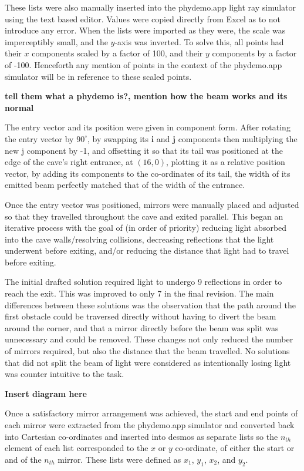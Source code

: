 \documentclass[11pt, letterpaper]{article}
\begin{document}
 
These lists were also manually inserted into the phydemo.app light ray simulator using the text based editor. Values were copied directly from Excel as to not introduce any error.  When the lists were imported as they were, the scale was imperceptibly small, and the $y$-axis was inverted. To solve this, all points had their $x$ components scaled by a factor of 100, and their $y$ components by a factor of -100. Henceforth any mention of points in the context of the phydemo.app simulator will be in reference to these scaled points.

\textbf{tell them what a phydemo is?, mention how the beam works and its normal}


The entry vector and its position were given in component form. After rotating the entry vector by $90^{\circ}$, by swapping its $\textbf{i}$ and $\textbf{j}$ components then multiplying the new j component by -1, and offsetting it so that its tail was positioned at the edge of the cave's right entrance, at $(16, 0)$, plotting it as a relative position vector, by adding its components to the co-ordinates of its tail, the width of its emitted beam perfectly matched that of the width of the entrance. 
		

Once the entry vector was positioned, mirrors were manually placed and adjusted so that they travelled throughout the cave and exited parallel. This began an iterative process with the goal of (in order of priority) reducing light absorbed into the cave walls/resolving collisions, decreasing reflections that the light underwent before exiting, and/or reducing the distance that light had to travel before exiting. 
		

The initial drafted solution required light to undergo 9 reflections in order to reach the exit. This was improved to only 7 in the final revision. The main differences between these solutions was the observation that the path around the first obstacle could be traversed directly without having to divert the beam around the corner, and that a mirror directly before the beam was split was unnecessary and could be removed. These changes not only reduced the number of mirrors required, but also the distance that the beam travelled. No solutions that did not split the beam of light were considered as intentionally losing light was counter intuitive to the task.

\textbf{Insert diagram here}
		
		

Once a satisfactory mirror arrangement was achieved, the start and end points of each mirror were extracted from the phydemo.app simulator and converted back into Cartesian co-ordinates and inserted into desmos as separate lists so the $n_{th}$ element of each list corresponded to the $x$ or $y$ co-ordinate, of either the start or and of the $n_{th}$ mirror. These lists were defined as $x_1$, $y_1$, $x_2$, and $y_2$.
\end{document}
